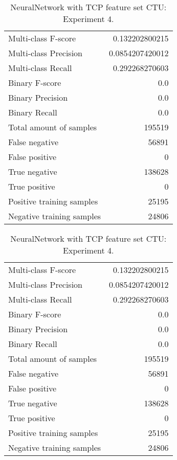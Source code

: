 \begin{table}[H]
\begin{minipage}{0.5\textwidth}
\caption{NeuralNetwork with TCP feature set CTU: \\Experiment 3.}
\centering
\begin{tabular}{l r}
\toprule
Multi-class F-score & 0.132202800215 \\
Multi-class Precision & 0.0854207420012 \\
Multi-class Recall & 0.292268270603 \\
\midrule
Binary F-score & 0.0 \\
Binary Precision & 0.0 \\
Binary Recall & 0.0 \\
\midrule
Total amount of samples & 195519 \\
False negative & 56891 \\
False positive & 0 \\
True negative & 138628 \\
True positive & 0 \\
\midrule
Positive training samples & 25195 \\
Negative training samples & 24806 \\
\bottomrule
\end{tabular}
\end{minipage}
\hfillx
\begin{minipage}{0.5\textwidth}
\caption{NeuralNetwork with TCP feature set CTU: \\Experiment 4.}
\centering
\begin{tabular}{l r}
\toprule
Multi-class F-score & 0.132202800215 \\
Multi-class Precision & 0.0854207420012 \\
Multi-class Recall & 0.292268270603 \\
\midrule
Binary F-score & 0.0 \\
Binary Precision & 0.0 \\
Binary Recall & 0.0 \\
\midrule
Total amount of samples & 195519 \\
False negative & 56891 \\
False positive & 0 \\
True negative & 138628 \\
True positive & 0 \\
\midrule
Positive training samples & 25195 \\
Negative training samples & 24806 \\
\bottomrule
\end{tabular}
\end{minipage}
\end{table}

